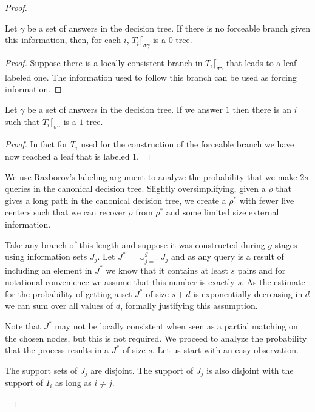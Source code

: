 \documentclass{article}\usepackage[a4paper,margin=20mm]{geometry}
\begin{document}
\begin{proof}
\begin{lemma}
Let $\gamma$ be a set of answers in the decision
tree.  If there is no forceable branch given this
information, then, for each $i$,
$T_i \lceil_{\sigma \gamma}$ is a $0$-tree.
\end{lemma}

\begin{proof}
Suppose there is a locally consistent branch in $T_i \lceil_{\sigma \gamma}$ 
that leads to a leaf labeled one.  
The information
used to follow this branch can be used as forcing
information.
\end{proof}

\begin{lemma}
Let $\gamma$ be a set of answers in the decision
tree.  If we answer $1$ then there is an $i$ such that
$T_i \lceil_{\sigma \gamma}$ is a $1$-tree.
\end{lemma}

\begin{proof}
In fact for $T_i$ used for the construction of 
the forceable branch we have now reached a leaf that is labeled $1$.
\end{proof}

We use Razborov's labeling argument \cite{Razborov1995}
to analyze the probability that we make $2s$ queries in the 
canonical decision tree.  Slightly oversimplifying, given
a $\rho$ that gives a long path in the canonical decision
tree, we create a $\rho^*$ with fewer live centers such
that we can recover $\rho$ from $\rho^*$ and some
limited size external information.

Take any branch of this length
and suppose it was constructed during $g$ stages
using information sets $J_j$.  
Let $J^*=\cup_{j=1}^g J_j$ and as any query is a result of including
an element in $J^*$ we know that it contains 
at least $s$ pairs and for notational
convenience we assume that this number is exactly $s$.
As the estimate for the probability of getting a set $J^*$
of size $s+d$ is exponentially decreasing in $d$ we can
sum over all values of $d$, formally justifying this assumption.

Note that $J^*$ may not be locally consistent when seen as
a partial matching on the chosen nodes, but this is not required.
We proceed to analyze the probability that the process
results in a $J^*$ of size $s$.  Let us start with
an easy observation.

\begin{lemma}\label{lemma:disjoint}
The support sets of $J_j$ are disjoint.  The support of
$J_j$ is also disjoint with the support of $I_i$ as
long as $i\not= j$.
\end{lemma}


\end{proof}
\end{document}
